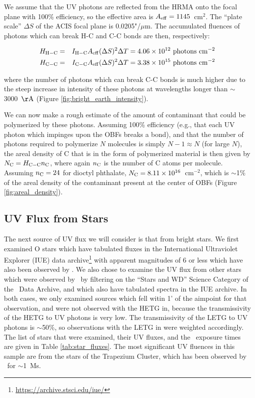 \documentclass[11pt]{article}
\begin{document}
We assume that the UV photons are reflected from the HRMA onto the focal plane with 100\% efficiency,
so the effective area is $A_{\rm eff} = 1145$~cm$^2$. The ``plate scale'' $\Delta{S}$ of the ACIS focal plane is
0.0205"/$\mu$m. The accumulated fluences of photons which can break H-C and C-C bonds are then, respectively:

\begin{eqnarray}
H_{\rm H-C} &=& I_{\rm H-C}A_{\rm eff}(\Delta{S})^2\Delta{T} = 4.06 \times 10^{12}~{\rm photons~cm^{-2}} \\
H_{\rm C-C} &=& I_{\rm C-C}A_{\rm eff}(\Delta{S})^2\Delta{T} = 3.38 \times 10^{15}~{\rm photons~cm^{-2}}\label{eqn:fluence}
\end{eqnarray}

\noindent
where the number of photons which can break C-C bonds is much higher due to the steep increase in intensity of these photons
at wavelengths longer than $\sim$3000~${\rm \AA}$ (Figure \ref{fig:bright_earth_intensity}).

We can now make a rough estimate of the amount of contaminant that could be polymerized by these photons. Assuming 100\%
efficiency (e.g., that each UV photon which impinges upon the OBFs breaks a bond), and that the number of photons required
to polymerize $N$ molecules is simply $N-1 \approx N$ (for large $N$), the areal density of C that is in the form of
polymerized material is then given by $N_{\rm C} = H_{\rm C-C}n_{\rm C}$, where again $n_{\rm C}$ is the number of C atoms per
molecule. Assuming $n_{\rm C} = 24$ for dioctyl phthalate, $N_{\rm C} = 8.11 \times 10^{16}$~cm$^{-2}$, which is $\sim$1\%
of the areal density of the contaminant present at the center of OBFs (Figure \ref{fig:areal_density}).

\subsection{UV Flux from Stars}

The next source of UV flux we will consider is that from bright stars. We first examined O stars which have tabulated
fluxes in the International Ultraviolet Explorer (IUE) data archive\footnote{\url{https://archive.stsci.edu/iue/}} with
apparent magnitudes of 6 or less which have also been observed by \chandra. We also chose to examine the UV flux from
other stars which were observed by \chandra~by filtering on the ``Stars and WD'' Science Category of the \chandra~Data
Archive, and which also have tabulated spectra in the IUE archive. In both cases, we only examined sources which fell
witin 1' of the aimpoint for that observation, and were not observed with the HETG in, because the transmissivity of
the HETG to UV photons is very low. The transmissivity of the LETG to UV photons is $\sim$50\%, so observations with
the LETG in were weighted accordingly. The list of stars that were examined, their UV fluxes, and the \chandra~exposure
times are given in Table \ref{tab:star_fluxes}. The most significant UV fluences in this sample are from the stars of
the Trapezium Cluster, which has been observed by \chandra~for $\sim$1~Ms.
\end{document}
